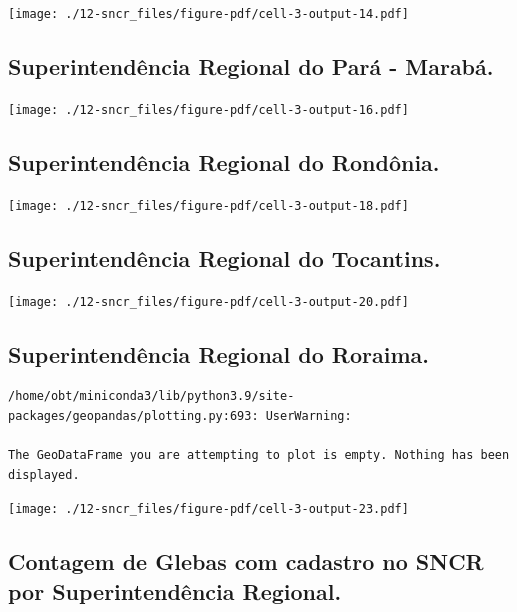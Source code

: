 \documentclass[
  letterpaper,
]{report}
\begin{document}
\texttt{[image: ./12-sncr\_files/figure-pdf/cell-3-output-14.pdf]}

\hypertarget{superintenduxeancia-regional-do-paruxe1---marabuxe1.-2}{%
\subsection{Superintendência Regional do Pará -
Marabá.}\label{superintenduxeancia-regional-do-paruxe1---marabuxe1.-2}}

\texttt{[image: ./12-sncr\_files/figure-pdf/cell-3-output-16.pdf]}

\hypertarget{superintenduxeancia-regional-do-ronduxf4nia.-2}{%
\subsection{Superintendência Regional do
Rondônia.}\label{superintenduxeancia-regional-do-ronduxf4nia.-2}}

\texttt{[image: ./12-sncr\_files/figure-pdf/cell-3-output-18.pdf]}

\hypertarget{superintenduxeancia-regional-do-tocantins.-2}{%
\subsection{Superintendência Regional do
Tocantins.}\label{superintenduxeancia-regional-do-tocantins.-2}}

\texttt{[image: ./12-sncr\_files/figure-pdf/cell-3-output-20.pdf]}

\hypertarget{superintenduxeancia-regional-do-roraima.-2}{%
\subsection{Superintendência Regional do
Roraima.}\label{superintenduxeancia-regional-do-roraima.-2}}

\begin{verbatim}
/home/obt/miniconda3/lib/python3.9/site-packages/geopandas/plotting.py:693: UserWarning:

The GeoDataFrame you are attempting to plot is empty. Nothing has been displayed.
\end{verbatim}

\texttt{[image: ./12-sncr\_files/figure-pdf/cell-3-output-23.pdf]}

\hypertarget{contagem-de-glebas-com-cadastro-no-sncr-por-superintenduxeancia-regional.}{%
\subsection{Contagem de Glebas com cadastro no SNCR por Superintendência
Regional.}\label{contagem-de-glebas-com-cadastro-no-sncr-por-superintenduxeancia-regional.}}
\end{document}
